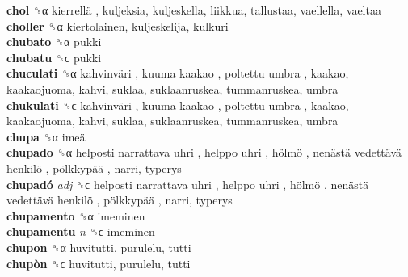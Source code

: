 \textbf{chol} ␝α   kierrellä , kuljeksia, kuljeskella, liikkua, tallustaa, vaellella, vaeltaa  \\
\textbf{choller} ␝α  kiertolainen, kuljeskelija, kulkuri  \\
\textbf{chubato} ␝α  pukki  \\
\textbf{chubatu} ␝ϲ  pukki  \\
\textbf{chuculati} ␝α   kahvinväri ,  kuuma kaakao ,  poltettu umbra , kaakao, kaakaojuoma, kahvi, suklaa, suklaanruskea, tummanruskea, umbra  \\
\textbf{chukulati} ␝ϲ   kahvinväri ,  kuuma kaakao ,  poltettu umbra , kaakao, kaakaojuoma, kahvi, suklaa, suklaanruskea, tummanruskea, umbra  \\
\textbf{chupa} ␝α   imeä   \\
\textbf{chupado} ␝α   helposti narrattava uhri ,  helppo uhri ,  hölmö ,  nenästä vedettävä henkilö ,  pölkkypää , narri, typerys  \\
\textbf{chupadó} \emph{adj}  ␝ϲ   helposti narrattava uhri ,  helppo uhri ,  hölmö ,  nenästä vedettävä henkilö ,  pölkkypää , narri, typerys  \\
\textbf{chupamento} ␝α  imeminen  \\
\textbf{chupamentu} \emph{n}  ␝ϲ  imeminen  \\
\textbf{chupon} ␝α  huvitutti, purulelu, tutti  \\
\textbf{chupòn} ␝ϲ  huvitutti, purulelu, tutti  \\
